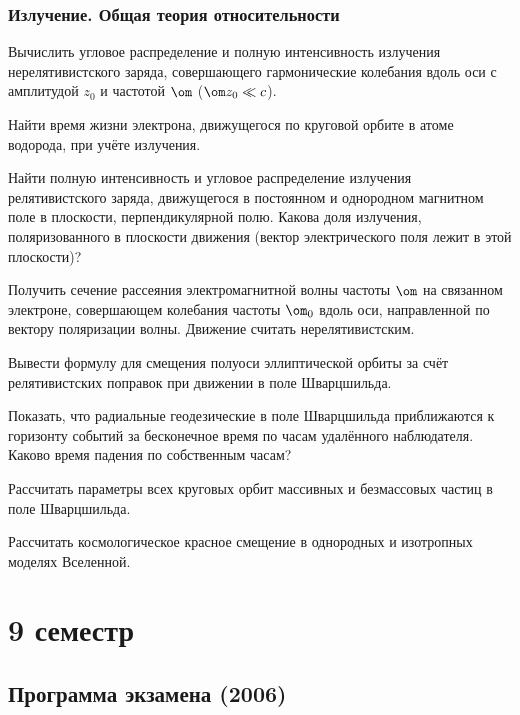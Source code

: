 \documentclass[a4paper,draft]{article}
\begin{document}
\subsubsection{Излучение. Общая теория относительности}

\begin{nums}{-2}
\item Вычислить угловое распределение и полную интенсивность излучения
нерелятивистского заряда, совершающего гармонические колебания вдоль оси с амплитудой
$z_0$ и частотой $\om$ ($\om z_0 \ll c$).
\item Найти время жизни электрона, движущегося по круговой орбите в атоме водорода, при учёте излучения.
\item Найти полную интенсивность и угловое распределение излучения релятивистского заряда, движущегося в
постоянном и однородном магнитном поле в плоскости, перпендикулярной полю. Какова доля излучения,
поляризованного в плоскости движения (вектор электрического поля лежит в этой плоскости)?
\item Получить сечение рассеяния электромагнитной волны частоты $\om$ на связанном электроне,
совершающем колебания частоты $\om_0$ вдоль оси, направленной по вектору поляризации волны. Движение считать
нерелятивистским.
\item Вывести формулу для смещения полуоси эллиптической орбиты за счёт релятивистских поправок при движении
в поле Шварцшильда.
\item Показать, что радиальные геодезические в поле Шварцшильда приближаются
к горизонту событий за бесконечное время по часам удалённого наблюдателя. Каково время падения
по собственным часам?
\item Рассчитать параметры всех круговых орбит массивных и безмассовых частиц в поле Шварцшильда.
\item Рассчитать космологическое красное смещение в однородных и изотропных моделях Вселенной.
\end{nums}


\medskip\dmvntrail

\newpage

\section{9 семестр}

\subsection{Программа экзамена (2006)}
\end{document}

